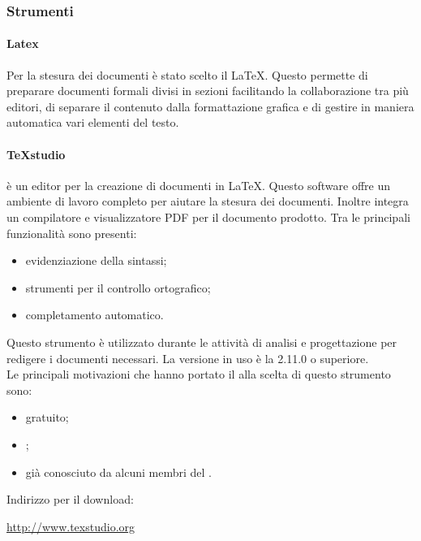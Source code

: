        \subsubsection{Strumenti}
            \paragraph{Latex}
            Per la stesura dei documenti è stato scelto il  \LaTeX{}. Questo permette di preparare documenti formali divisi in sezioni facilitando la collaborazione tra più editori, di separare il contenuto dalla formattazione grafica e di gestire in maniera automatica vari elementi del testo.
            \paragraph{TeXstudio}\label{sec:texstudio}
             è un editor per la creazione di documenti in \LaTeX. Questo software offre un ambiente di lavoro completo per aiutare la stesura dei documenti. Inoltre integra un compilatore e visualizzatore PDF per il documento prodotto. Tra le principali funzionalità sono presenti:
            \begin{itemize}
            	\item evidenziazione della sintassi;
            	\item strumenti per il controllo ortografico;
            	\item completamento automatico.
            \end{itemize}
	        Questo strumento è utilizzato durante le attività di analisi e progettazione per redigere i documenti necessari. La versione in uso è la 2.11.0 o superiore. \\
            Le principali motivazioni che hanno portato il  alla scelta di questo strumento sono:
            \begin{itemize}
            	\item gratuito;
            	\item {};
            	\item già conosciuto da alcuni membri del .
	        \end{itemize}
            Indirizzo per il download:
			\begin{center}
	            \url{http://www.texstudio.org}
	        \end{center}

